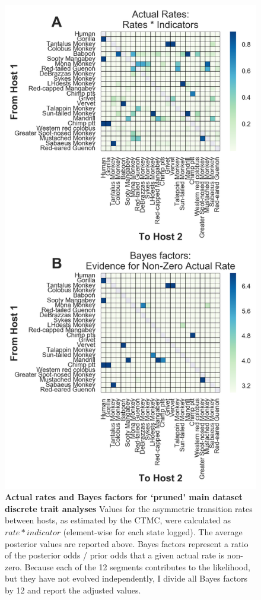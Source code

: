 \begin{figure}[ht!]
  \begin{centering}
    \includegraphics[width=.5\linewidth]{./png/siv_pruneddata_transmissions.png}
  	\caption[Pairwise host transmission rates (`pruned' dataset)]{\textbf{Actual rates and Bayes factors for `pruned' main dataset discrete trait analyses }
    Values for the asymmetric transition rates between hosts, as estimated by the CTMC, were calculated as $rate * indicator$ (element-wise for each state logged).
    The average posterior values are reported above.
    Bayes factors represent a ratio of the posterior odds / prior odds that a given actual rate is non-zero.
    Because each of the 12 segments contributes to the likelihood, but they have not evolved independently, I divide all Bayes factors by 12 and report the adjusted values.
        }
  	\label{siv_pruneddata_transmissions}
  \end{centering}
\end{figure}

